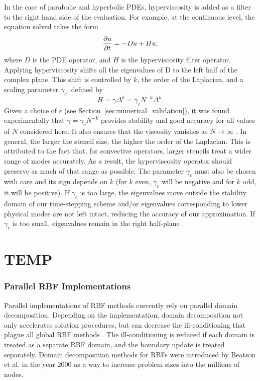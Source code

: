 \documentclass[11pt]{report}
\begin{document}
{In the case of parabolic and hyperbolic PDEs, hyperviscosity is added as a filter to the right hand side of the evaluation. For example, at the continuous level, 
the equation solved takes the form
\begin{equation}
\frac{\partial u}{\partial t} = - D u + H u,
\label{eq:evaluation_with_hyperviscosity}
\end{equation}
where $D$ is the PDE operator, and $H$ is the hyperviscosity filter operator.
Applying hyperviscosity shifts all the eigenvalues of D to the left half of the complex plane. 
This shift is controlled by $k$, the order of the Laplacian, and a scaling parameter $\gamma_c$, defined by
\begin{equation*}	
H = \gamma \Delta^{k} = \gamma_c N^{-k} \Delta^{k}.
\end{equation*}
Given a choice of $\epsilon$ (see Section~\ref{sec:numerical_validation}), it was found experimentally that $\gamma = \gamma_c N^{-k}$  provides stability and good accuracy for all values of $N$ considered here. It also ensures that the viscosity vanishes as $N\rightarrow\infty$ \cite{FlyerLehto11}.
In general, the larger the stencil size, the higher the order of the Laplacian.  This is attributed to the fact that, for convective operators, larger stencils treat a wider range of modes accurately. As a result, the hyperviscosity operator should preserve as much of that range as possible. The parameter $\gamma_c$ must also be chosen with care and its sign depends on $k$ (for $k$ even, $\gamma_c$ will be negative and for $k$ odd, it will be positive). If $\gamma_c$ is too large, the eigenvalues move outside the stability domain of our time-stepping scheme and/or eigenvalues corresponding to lower physical modes are not left intact, reducing the accuracy of our approximation. If $\gamma_c$ is too small, eigenvalues remain in the right half-plane \cite{FornbergLehto11,FlyerLehto11}.



\chapter{TEMP}


\subsection{Parallel RBF Implementations}
Parallel implementations of RBF methods currently rely on parallel domain decomposition. Depending on the implementation, domain decomposition not only accelerates solution procedures, but can decrease the ill-conditioning that plague all global RBF methods \cite{Divo2007}. The ill-conditioning is reduced if each domain is treated as a separate RBF domain, and the boundary update is treated separately. Domain decomposition methods for RBFs were introduced by Beatson et al. \cite{Beatson2000} in the year 2000 as a way to increase problem sizes into the millions of nodes.

}
\end{document}
